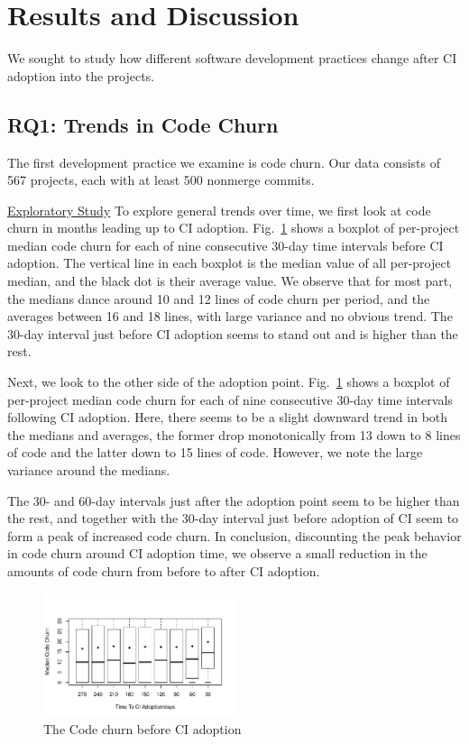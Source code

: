 
\section{Results and Discussion}

We sought to study how different software development practices change after CI adoption into the projects. 


\subsection{RQ1: Trends in Code Churn}

The first development practice we examine is code churn.
Our data consists of 567 projects, each with at least 500 nonmerge commits.

\noindent \underline{Exploratory Study} To explore general trends over time, we first look at code churn in months leading up to CI adoption.
Fig.~\ref{Fig:CodeChurnBefore} shows a boxplot of per-project median code churn for each of nine consecutive 30-day time intervals before CI adoption.
The vertical line in each boxplot is the median value of all per-project median, and the black dot is their average value.
We observe that for most part, the medians dance around 
10 and 12 lines of code churn per period, and the averages between 16 and 18 lines, with large variance and no obvious trend. The 30-day interval just before CI adoption seems to stand out and is higher than the rest.

Next, we look to the other side of the adoption point. Fig.~\ref{Fig:CodeChurnBefore} shows a boxplot of per-project median code churn for each of nine consecutive 30-day time intervals following CI adoption.
Here,  there seems to be a slight downward trend in both the medians and averages, the former drop monotonically from 13 down to 8 lines of code and the latter down to 15 lines of code.
However, we note the large variance around the medians.

The 30- and 60-day intervals just after the adoption point seem to be higher than the rest, and together with the 30-day interval just before adoption of CI seem to form a peak of increased code churn.
In conclusion, discounting the peak behavior in code churn around CI adoption time, we observe a small reduction in the amounts of code churn from before to after CI adoption.


\begin{figure}[!t]
\centering
\includegraphics[width=0.5\textwidth]{churn_before.pdf}
\caption{The Code churn before CI adoption}
\label{Fig:CodeChurnBefore}
\end{figure}


